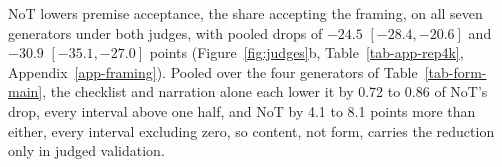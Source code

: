 NoT lowers premise acceptance, the share accepting the framing, on all seven
generators under both judges, with pooled drops of $-24.5$
$[-28.4, -20.6]$ and $-30.9$ $[-35.1, -27.0]$ points
(Figure~\ref{fig:judges}b, Table~\ref{tab-app-rep4k}, Appendix~\ref{app-framing}).
Pooled over the four generators of Table~\ref{tab-form-main}, the checklist
and narration alone each lower it by 0.72 to 0.86 of NoT's drop,
every interval above one half, and NoT by 4.1 to 8.1 points more than either,
every interval excluding zero, so content, not form, carries the
reduction only in judged validation.
